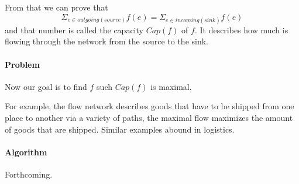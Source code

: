 From that we can prove that
 \[\Sigma_{e\in outgoing(source)} f(e) = \Sigma_{e\in incoming(sink)} f(e)\]
and that number is called the capacity $Cap(f)$ of $f$.
It describes how much is flowing through the network from the source to the sink.

\paragraph{Problem}
Now our goal is to find $f$ such $Cap(f)$ is maximal.

For example, the flow network describes goods that have to be shipped from one place to another via a variety of paths, the maximal flow maximizes the amount of goods that are shipped.
Similar examples abound in logistics.

\paragraph{Algorithm}
Forthcoming.
